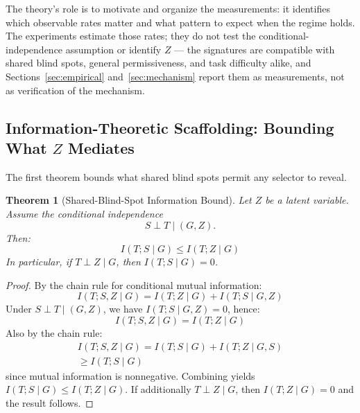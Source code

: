 \documentclass[a4paper,journal]{IAENGtran}
\newtheorem{Theorem}{Theorem}[section]
\begin{document}
The theory's role is to motivate and organize the measurements: it identifies
which observable rates matter and what pattern to expect when the regime holds.
The experiments estimate those rates; they do not test the
conditional-independence assumption or identify $Z$ — the signatures are
compatible with shared blind spots, general permissiveness, and task difficulty
alike, and Sections~\ref{sec:empirical} and~\ref{sec:mechanism} report them as
measurements, not as verification of the mechanism.

\subsection{Information-Theoretic Scaffolding: Bounding What $Z$ Mediates}

The first theorem bounds what shared blind spots permit any selector to reveal.

\begin{Theorem}[Shared-Blind-Spot Information Bound]
\label{thm:info_bound}
Let $Z$ be a latent variable. Assume the conditional independence
\begin{equation*}
S \perp T \mid (G, Z).
\end{equation*}
Then:
\begin{equation}
I(T; S \mid G) \leq I(T; Z \mid G)
\end{equation}
In particular, if $T \perp Z \mid G$, then $I(T; S \mid G) = 0$.
\end{Theorem}

\begin{proof}
By the chain rule for conditional mutual information:
\begin{equation}
I(T; S, Z \mid G) = I(T; Z \mid G) + I(T; S \mid G, Z)
\end{equation}
Under $S \perp T \mid (G, Z)$, we have $I(T; S \mid G, Z) = 0$, hence:
\begin{equation}
I(T; S, Z \mid G) = I(T; Z \mid G)
\end{equation}
Also by the chain rule:
\begin{multline}
I(T; S, Z \mid G) = I(T; S \mid G) + I(T; Z \mid G, S) \\
\geq I(T; S \mid G)
\end{multline}
since mutual information is nonnegative. Combining yields $I(T; S \mid G) \leq I(T; Z \mid G)$.
If additionally $T \perp Z \mid G$, then $I(T; Z \mid G) = 0$ and the result follows.

\end{proof}
\end{document}
